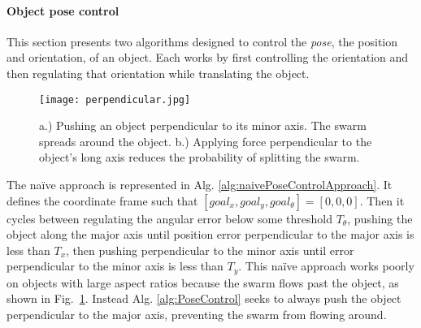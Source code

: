 






\paragraph{Object pose control}
This section presents two algorithms designed to control the \emph{pose}, the position and orientation, of an object.  
Each works by first controlling the orientation and then regulating that orientation while translating the object. 

\begin{figure}
\begin{center}
	\texttt{[image: perpendicular.jpg]}
\end{center}
\vspace{-1em}
\caption{\label{fig:perpendicular} 
a.) Pushing an object perpendicular to its minor axis. The swarm spreads around the object. b.)  Applying force perpendicular to the object's long axis reduces the probability of splitting the swarm.
}
\vspace{-1em}
\end{figure}

The na\"{i}ve approach is represented in Alg. \ref{alg:naivePoseControlApproach}. It defines  the coordinate frame such that $[goal_x, goal_y, goal_{\theta}] = [0,0,0]$.
Then it cycles between regulating the angular error below some threshold $T_{\theta}$,
pushing the object along the major axis until position error perpendicular to the major axis is less than $T_x$, then pushing perpendicular to the minor axis until error perpendicular to the minor axis is less than $T_y$. 
This na\"{i}ve approach works poorly on objects with large aspect ratios because the swarm flows past the object, as shown in Fig.~\ref{fig:perpendicular}. 
Instead Alg. \ref{alg:PoseControl} seeks to always push the object perpendicular to the major axis, preventing the swarm from flowing around. 


